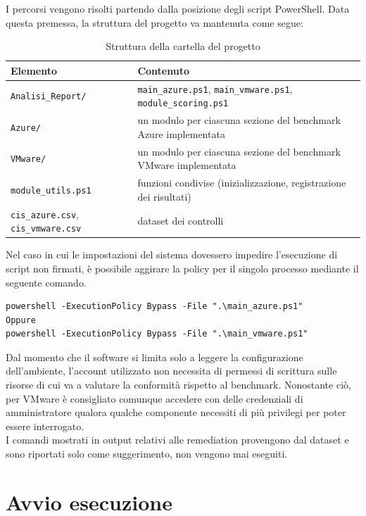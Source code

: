 \documentclass[a4paper,11pt]{report}
\begin{document}
I percorsi vengono risolti partendo dalla posizione degli script PowerShell. Data questa premessa, la struttura del progetto va mantenuta come segue:


\begin{table}[H]
\centering
\small
\begin{tabular}{p{4.6cm}p{7cm}}
\hline
\textbf{Elemento} & \textbf{Contenuto} \\
\hline
\texttt{Analisi\_Report/} & \texttt{main\_azure.ps1}, \texttt{main\_vmware.ps1}, \texttt{module\_scoring.ps1} \\ \hline
\texttt{Azure/} & un modulo per ciascuna sezione del benchmark Azure implementata \\ \hline
\texttt{VMware/} & un modulo per ciascuna sezione del benchmark VMware implementata \\ \hline
\texttt{module\_utils.ps1} & funzioni condivise (inizializzazione, registrazione dei risultati) \\ \hline
\texttt{cis\_azure.csv}, \texttt{cis\_vmware.csv} & dataset dei controlli \\ 
\hline
\end{tabular}
\caption{Struttura della cartella del progetto}
\label{tab:struttura}
\end{table}

Nel caso in cui le impostazioni del sistema dovessero impedire l'esecuzione di script non firmati, è possibile aggirare la policy per il singolo processo mediante il seguente comando.

\begin{lstlisting}[style=azcli]
powershell -ExecutionPolicy Bypass -File ".\main_azure.ps1"
Oppure
powershell -ExecutionPolicy Bypass -File ".\main_vmware.ps1"
\end{lstlisting}

Dal momento che il software si limita solo a leggere la configurazione dell'ambiente, l'account utilizzato non necessita di permessi di scrittura sulle risorse di cui va a valutare la conformità rispetto al benchmark. Nonostante ciò, per VMware è consigliato comunque accedere con delle credenziali di amministratore qualora qualche componente necessiti di più privilegi per poter essere interrogato.\\
I comandi mostrati in output relativi alle remediation provengono dal dataset e sono riportati solo come suggerimento, non vengono mai eseguiti.

\section{Avvio esecuzione}
\end{document}

